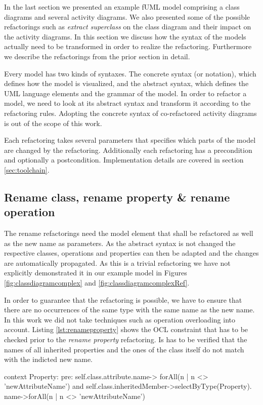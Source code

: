 \documentclass{llncs}
\begin{document}
In the last section we presented an example fUML model comprising a class diagrams and several activity diagrams. We also presented some 
of the possible refactorings such as \textit{extract superclass} on the class diagram and their impact on the activity diagrams. In this 
section we discuss how the syntax of the models actually need to be transformed in order to realize the refactoring. Furthermore we 
describe the refactorings from the prior section in detail.

Every model has two kinds of syntaxes. The concrete syntax (or notation), which defines how the model is visualized, and the abstract
syntax, which defines the UML language elements and the grammar of the model. In order to refactor a model, we need to look 
at its abstract syntax and transform it according to the refactoring rules. Adopting the concrete syntax of co-refactored activity 
diagrams is out of the scope of this work.

Each refactoring takes several parameters that specifies which parts of the model are changed by the refactoring. Additionally each 
refactoring has a precondition and optionally a postcondition. Implementation details are covered in section \ref{sec:toolchain}.

\subsection{Rename class, rename property \& rename operation}
\label{sec:renames}
The rename refactorings need the model element that shall be refactored as well as the new name as parameters. As the abstract syntax 
is not changed the respective classes, operations and properties can then be adapted 
and the changes are automatically propagated. As this is a trivial refactoring we have not explicitly demonstrated it in our example model 
in Figures \ref{fig:classdiagramcomplex} and \ref{fig:classdiagramcomplexRef}. 

In order to guarantee that the 
refactoring is possible, we have to ensure that there are no occurrences of the same type with the same name as the 
new name. In this work we did not take techniques such as operation overloading into account. Listing \ref{lst:renameproperty} shows the 
OCL constraint that has to be checked prior to the \textit{rename property} 
refactoring. Is has to be verified that the names of all inherited properties and the ones of the class itself do not match 
with the indicted new name.

\begin{lstsingle}[language=OCL,caption=OCL for \textit{rename property} refactoring,label=lst:renameproperty]
context Property:
pre:  self.class.attribute.name->
        forAll(n | n <> 'newAttributeName') 
      and 
      self.class.inheritedMember->selectByType(Property).
        name->forAll(n | n <> 'newAttributeName')
\end{lstsingle}
\end{document}
